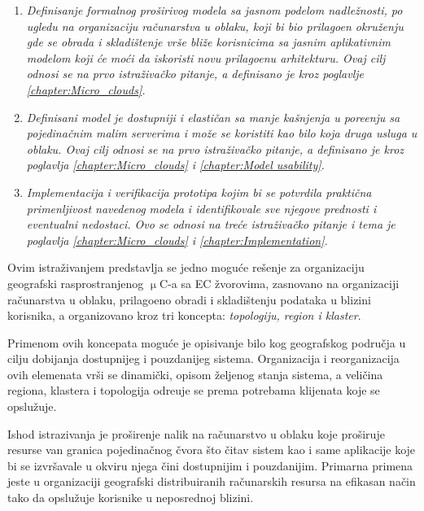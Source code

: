\begin{enumerate}[start=1,label={(\bfseries \arabic*)}]
	\item \textit{Definisanje formalnog pro\v sirivog modela sa jasnom podelom nadle\v znosti, po ugledu na organizaciju ra\v cunarstva u oblaku, koji bi bio prilago\dj en okru\v zenju gde se obrada i skladi\v stenje vrše bli\v ze korisnicima sa jasnim aplikativnim modelom koji \'ce mo\'ci da iskoristi novu prilago\dj enu arhitekturu. Ovaj cilj odnosi se na prvo istra\v ziva\v cko pitanje, a definisano je kroz poglavlje \ref{chapter:Micro_clouds}.}
	\item \textit{Definisani model je dostupniji i elasti\v can sa manje ka\v snjenja u pore\dj enju sa pojedina\v cnim malim serverima i mo\v ze se koristiti kao bilo koja druga usluga u oblaku. Ovaj cilj odnosi se na prvo istra\v ziva\v cko pitanje, a definisano je kroz poglavlja \ref{chapter:Micro_clouds} i \ref{chapter:Model usability}.}
	\item \textit{Implementacija i verifikacija prototipa kojim bi se potvrdila prakti\v cna primenljivost navedenog modela i identifikovale sve njegove prednosti i eventualni nedostaci. Ovo se odnosi na tre\'ce istra\v ziva\v cko pitanje i tema je poglavlja \ref{chapter:Micro_clouds} i \ref{chapter:Implementation}.}
\end{enumerate}

\noindent
Ovim istra\v zivanjem predstavlja se jedno mogu\'ce re\v senje za organizaciju geografski rasprostranjenog $\upmu$C-a sa EC \v zvorovima, zasnovano na organizaciji ra\v cunarstva u oblaku, prilago\dj eno obradi i skladi\v stenju podataka u blizini korisnika, a organizovano kroz tri koncepta: \emph{topologiju, region i klaster}. 

Primenom ovih koncepata mogu\'ce je opisivanje bilo kog geografskog podru\v cja u cilju dobijanja dostupnijeg i pouzdanijeg sistema. Organizacija i reorganizacija ovih elemenata vr\v si se dinami\v cki, opisom \v zeljenog stanja sistema, a veli\v cina regiona, klastera i topologija odre\dj uje se prema potrebama klijenata koje se opslu\v zuje.

Ishod istrazivanja je pro\v sirenje nalik na ra\v cunarstvo u oblaku koje pro\v siruje resurse van granica pojedina\v cnog \v cvora \v sto \v citav sistem kao i same aplikacije koje bi se izvr\v savale u okviru njega \v cini dostupnijim i pouzdanijim. Primarna primena jeste u organizaciji geografski distribuiranih ra\v cunarskih resursa na efikasan na\v cin tako da opslu\v zuje korisnike u neposrednoj blizini. 

